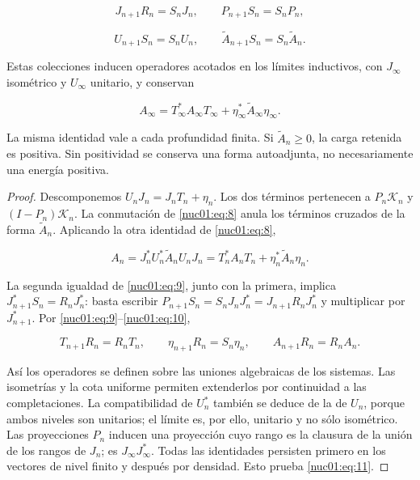 \begin{equation}
J_{n+1}R_n=S_nJ_n,\qquad
P_{n+1}S_n=S_nP_n,
\label{nuc01:eq:9}
\end{equation}

\begin{equation}
U_{n+1}S_n=S_nU_n,\qquad
\widetilde A_{n+1}S_n=S_n\widetilde A_n.
\label{nuc01:eq:10}
\end{equation}

\begin{theorem}
Estas colecciones inducen operadores acotados en los límites inductivos, con \(J_\infty\) isométrico y \(U_\infty\) unitario, y conservan

\begin{equation}
A_\infty
=T_\infty^*A_\infty T_\infty
 +\eta_\infty^*\widetilde A_\infty\eta_\infty.
\label{nuc01:eq:11}
\end{equation}

La misma identidad vale a cada profundidad finita. Si \(\widetilde A_n\geq0\), la carga retenida es positiva. Sin positividad se conserva una forma autoadjunta, no necesariamente una energía positiva.
\end{theorem}

\begin{proof}
Descomponemos \(U_nJ_n=J_nT_n+\eta_n\). Los dos términos pertenecen a \(P_n\mathscr K_n\) y \((I-P_n)\mathscr K_n\). La conmutación de \eqref{nuc01:eq:8} anula los términos cruzados de la forma \(\widetilde A_n\). Aplicando la otra identidad de \eqref{nuc01:eq:8},

\[
A_n=J_n^*U_n^*\widetilde A_nU_nJ_n
=T_n^*A_nT_n+\eta_n^*\widetilde A_n\eta_n.
\]

La segunda igualdad de \eqref{nuc01:eq:9}, junto con la primera, implica
\(J_{n+1}^*S_n=R_nJ_n^*\): basta escribir
\(P_{n+1}S_n=S_nJ_nJ_n^*=J_{n+1}R_nJ_n^*\) y multiplicar por \(J_{n+1}^*\).
Por \eqref{nuc01:eq:9}–\eqref{nuc01:eq:10},

\[
T_{n+1}R_n=R_nT_n,\qquad
\eta_{n+1}R_n=S_n\eta_n,\qquad
A_{n+1}R_n=R_nA_n.
\]

Así los operadores se definen sobre las uniones algebraicas de los sistemas. Las isometrías y la cota uniforme permiten extenderlos por continuidad a las completaciones. La compatibilidad de \(U_n^*\) también se deduce de la de \(U_n\), porque ambos niveles son unitarios; el límite es, por ello, unitario y no sólo isométrico. Las proyecciones \(P_n\) inducen una proyección cuyo rango es la clausura de la unión de los rangos de \(J_n\); es \(J_\infty J_\infty^*\). Todas las identidades persisten primero en los vectores de nivel finito y después por densidad. Esto prueba \eqref{nuc01:eq:11}.
\end{proof}

